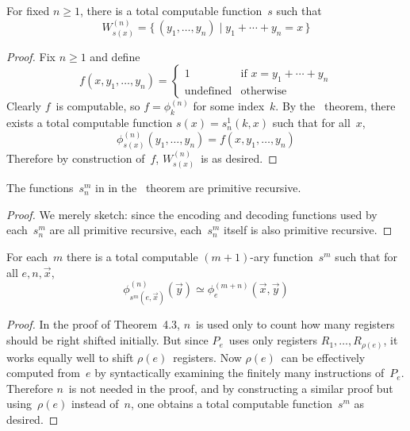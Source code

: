 For fixed $n\ge1$, there is a total computable function~$s$ such that
$$W_{s(x)}^{(n)}=\{\,(y_1,\ldots,y_n)\mid y_1+\cdots+y_n=x\,\}$$
\begin{proof}
Fix $n\ge1$ and define
$$f(x,y_1,\ldots,y_n)=\begin{cases}
1&\text{if }x=y_1+\cdots+y_n\\
\text{undefined}&\text{otherwise}
\end{cases}$$
Clearly $f$~is computable, so $f=\phi_k^{(n)}$ for some index~$k$. By the \smn\ theorem, there exists a total computable function $s(x)=s_n^1(k,x)$ such that for all~$x$,
$$\phi_{s(x)}^{(n)}(y_1,\ldots,y_n)=f(x,y_1,\ldots,y_n)$$
Therefore by construction of~$f$, $W_{s(x)}^{(n)}$~is as desired.
\end{proof}


The functions~$s^m_n$ in in the \smn\ theorem are primitive recursive.
\begin{proof}
We merely sketch: since the encoding and decoding functions used by each~$s^m_n$ are all primitive recursive, each~$s^m_n$ itself is also primitive recursive.
\end{proof}


For each~$m$ there is a total computable $(m+1)$-ary function~$s^m$ such that for all $e,n,\vec{x}$,
$$\phi_{s^m(e,\vec{x})}^{(n)}(\vec{y})\simeq\phi_e^{(m+n)}(\vec{x},\vec{y})$$
\begin{proof}
In the proof of Theorem~4.3, $n$~is used only to count how many registers should be right shifted initially. But since $P_e$~uses only registers $R_1,\ldots,R_{\rho(e)}$, it works equally well to shift $\rho(e)$~registers. Now $\rho(e)$~can be effectively computed from~$e$ by syntactically examining the finitely many instructions of~$P_e$. Therefore $n$~is not needed in the proof, and by constructing a similar proof but using~$\rho(e)$ instead of~$n$, one obtains a total computable function~$s^m$ as desired.
\end{proof}